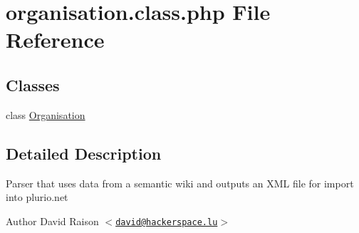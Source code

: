 \hypertarget{organisation_8class_8php}{
\section{organisation.class.php File Reference}
\label{organisation_8class_8php}
}
\subsection*{Classes}
\begin{DoxyCompactItemize}
\item 
class \hyperlink{classOrganisation}{Organisation}
\end{DoxyCompactItemize}


\subsection{Detailed Description}
Parser that uses data from a semantic wiki and outputs an XML file for import into plurio.net

\begin{DoxyAuthor}{Author}
David Raison $<$\href{mailto:david@hackerspace.lu}{\tt david@hackerspace.lu}$>$ 
\end{DoxyAuthor}
